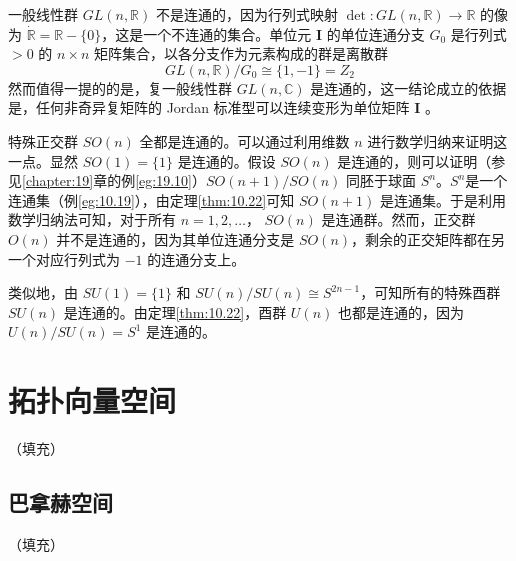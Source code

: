 \begin{eg}\label{eg:10.22}
	一般线性群 $GL(n,\mathbb{R} )$ 不是连通的，因为行列式映射 $\det :GL(n,\mathbb{R} )\rightarrow \mathbb{R}$ 的像为 $\dot{\mathbb{R}} =\mathbb{R} -\{0\}$，这是一个不连通的集合。单位元 $ \mathbf{I}$ 的单位连通分支 $G_{0}$ 是行列式 $  >0$ 的 $n\times n$ 矩阵集合，以各分支作为元素构成的群是离散群
\begin{equation*}
    GL(n,\mathbb{R} )/G_{0} \cong \{1,-1\}=Z_{2}
\end{equation*}
然而值得一提的的是，复一般线性群 $GL(n,\mathbb{C} )$ 是连通的，这一结论成立的依据是，任何非奇异复矩阵的 Jordan 标准型可以连续变形为单位矩阵 $ \mathbf{I}$ 。
\end{eg}

特殊正交群 $SO(n)$ 全都是连通的。可以通过利用维数 $n$ 进行数学归纳来证明这一点。显然 $SO(1)=\{1\}$ 是连通的。假设 $SO(n)$ 是连通的，则可以证明（参见\ref{chapter:19}章的例\ref{eg:19.10}）$SO(n+1)/SO(n)$ 同胚于球面 $S^{n}$。$S^{n}$是一个连通集（例\ref{eg:10.19}），由定理\ref{thm:10.22}可知 $ SO(n+1)$ 是连通集。于是利用数学归纳法可知，对于所有 $n=1,2,\dotsc $， $ SO(n)$ 是连通群。然而，正交群 $O(n)$ 并不是连通的，因为其单位连通分支是 $SO(n)$，剩余的正交矩阵都在另一个对应行列式为 $ -1$ 的连通分支上。

类似地，由 $SU(1)=\{1\}$ 和 $SU(n)/SU(n)\cong S^{2n-1}$，可知所有的特殊酉群 $SU(n)$ 是连通的。由定理\ref{thm:10.22}，酉群 $U(n)$ 也都是连通的，因为 $U(n)/SU(n)=S^{1}$ 是连通的。

\section{拓扑向量空间}
（填充）
\subsection{巴拿赫空间}
（填充）